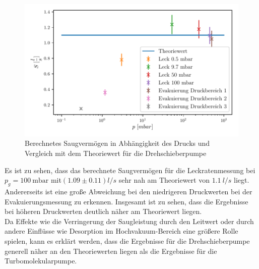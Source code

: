 \begin{figure}[H]
    \centering
    \includegraphics{build/plots/saug_dreh.pdf}
    \caption{Berechnetes Saugvermögen in Abhängigkeit des Drucks und Vergleich mit dem Theoriewert für die Drehschieberpumpe}
    \label{fig:plotds}
  \end{figure}
  \noindent
  Es ist zu sehen, dass das berechnete Saugvermögen für die Leckratenmessung bei $p_g = \SI{100}{\milli\bar}$ mit$(1.09 \pm 0.11) l/s$ sehr nah am Theoriewert von $1.1\ l/s$ liegt. Andererseits ist eine große Abweichung bei den niedrigeren Druckwerten bei der Evakuierungsmessung zu erkennen. Insgesamt ist zu sehen, dass die Ergebnisse bei höheren Druckwerten deutlich näher am Theoriewert liegen. \\
  Da Effekte wie die Verringerung der Saugleistung durch den Leitwert oder durch andere Einflüsse wie Desorption im Hochvakuum-Bereich eine größere Rolle spielen, kann es erklärt werden, dass die Ergebnisse für die Drehschieberpumpe generell näher an den Theoriewerten liegen als die Ergebnisse für die Turbomolekularpumpe.   